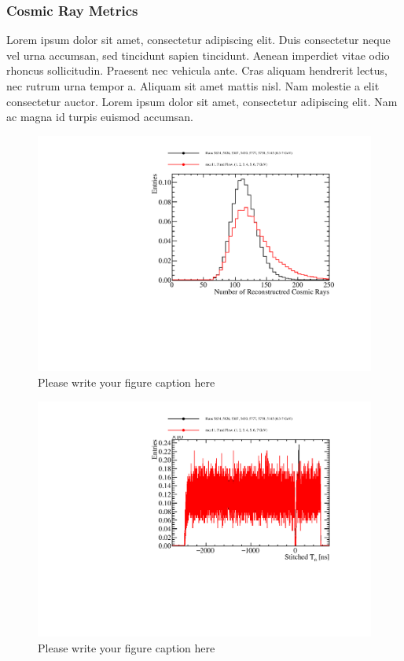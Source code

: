 \subsubsection{Cosmic Ray Metrics}

Lorem ipsum dolor sit amet, consectetur adipiscing elit. Duis consectetur neque vel urna accumsan, sed tincidunt sapien tincidunt. Aenean imperdiet vitae odio rhoncus sollicitudin. Praesent nec vehicula ante. Cras aliquam hendrerit lectus, nec rutrum urna tempor a. Aliquam sit amet mattis nisl. Nam molestie a elit consectetur auctor. Lorem ipsum dolor sit amet, consectetur adipiscing elit. Nam ac magna id turpis euismod accumsan.

\begin{figure}
\includegraphics[width=1.0\textwidth]{Figures/Metrics/Data/Cosmics/NumberofReconstructedCosmicRays.pdf}
\caption{Please write your figure caption here}
\label{fig:9}
\end{figure}

\begin{figure}
\includegraphics[width=1.0\textwidth]{Figures/Metrics/Data/Cosmics/StitchedT0.pdf}
\caption{Please write your figure caption here}
\label{fig:10}
\end{figure}

